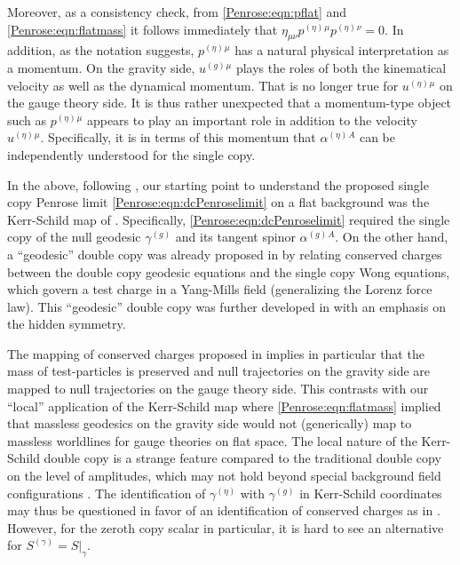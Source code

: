Moreover, as a consistency check, from \eqref{Penrose:eqn:pflat} and \eqref{Penrose:eqn:flatmass} it follows immediately that $\eta_{\mu \nu} p^{(\eta)}{}^{\mu}p^{(\eta)}{}^{\nu} = 0$. In addition, as the notation suggests, $p^{(\eta)}{}^{\mu}$ has a natural physical interpretation as a momentum. On the gravity side, $u^{(g)}{}^{\mu}$ plays the roles of both the kinematical velocity as well as the dynamical momentum. That is no longer true for $u^{(\eta)}{}^{\mu}$ on the gauge theory side. It is thus rather unexpected that a momentum-type object such as $p^{(\eta)}{}^{\mu}$ appears to play an important role in addition to the velocity $u^{(\eta)}{}^{\mu}$. Specifically, it is in terms of this momentum that $\alpha^{(\eta)}{}^A$ can be independently understood for the single copy.

In the above, following \cite{Luna:2018dpt}, our starting point to understand the proposed single copy Penrose limit \eqref{Penrose:eqn:dcPenroselimit} on a flat background was the Kerr-Schild map of \cite{Monteiro:2014cda}. Specifically, \eqref{Penrose:eqn:dcPenroselimit} required the single copy of the null geodesic $\gamma^{(g)}$ and its tangent spinor $\alpha^{(g)}{}^A$. On the other hand, a ``geodesic'' double copy was already proposed in \cite{Gonzo:2021drq} by relating conserved charges between the double copy geodesic equations and the single copy Wong equations, which govern a test charge in a Yang-Mills field  (generalizing the Lorenz force law). This ``geodesic'' double copy was further developed in \cite{Ball:2023xnr} with an emphasis on the hidden symmetry.

The mapping of conserved charges proposed in \cite{Gonzo:2021drq} implies in particular that the mass of test-particles is preserved and null trajectories on the gravity side are mapped to null trajectories on the gauge theory side. This contrasts with our ``local'' application of the Kerr-Schild map where \eqref{Penrose:eqn:flatmass} implied that massless geodesics on the gravity side would not (generically) map to massless worldlines for gauge theories on flat space. The local nature of the Kerr-Schild double copy is a strange feature compared to the traditional double copy on the level of amplitudes, which may not hold beyond special background field configurations \cite{Luna:2022dxo}.  The identification  of $\gamma^{(\eta)}$ with $\gamma^{(g)}$ in Kerr-Schild coordinates may thus be questioned in favor of an identification of conserved charges as in \cite{Gonzo:2021drq,Luna:2022dxo}. However, for the zeroth copy scalar in particular, it is hard to see an alternative for $S^{(\gamma)} = S|_{\gamma}$. 

